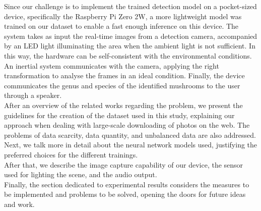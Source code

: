 \documentclass[conference]{IEEEtran}
\begin{document}
Since our challenge is to implement the trained detection model on a pocket-sized device, specifically the Raspberry Pi Zero 2W\cite{raspberrypi2021zero2wbrief}, a more lightweight model was trained on our dataset to enable a fast enough inference on this device. The system takes as input the real-time images from a detection camera, accompanied by an LED light illuminating the area when the ambient light is not sufficient. In this way, the hardware can be self-consistent with the environmental conditions. An inertial system communicates with the camera, applying the right transformation to analyse the frames in an ideal condition. Finally, the device communicates the genus and species of the identified mushrooms to the user through a speaker.\\
After an overview of the related works regarding the problem, we present the guidelines for the creation of the dataset used in this study, explaining our approach when dealing with large-scale downloading of photos on the web. The problems of data scarcity, data quantity, and unbalanced data are also addressed.\\
Next, we talk more in detail about the neural network models used, justifying the preferred choices for the different trainings.\\
After that, we describe the image capture capability of our device, the sensor used for lighting the scene, and the audio output.\\
Finally, the section dedicated to experimental results considers the measures to be implemented and problems to be solved, opening the doors for future ideas and work.
\end{document}

